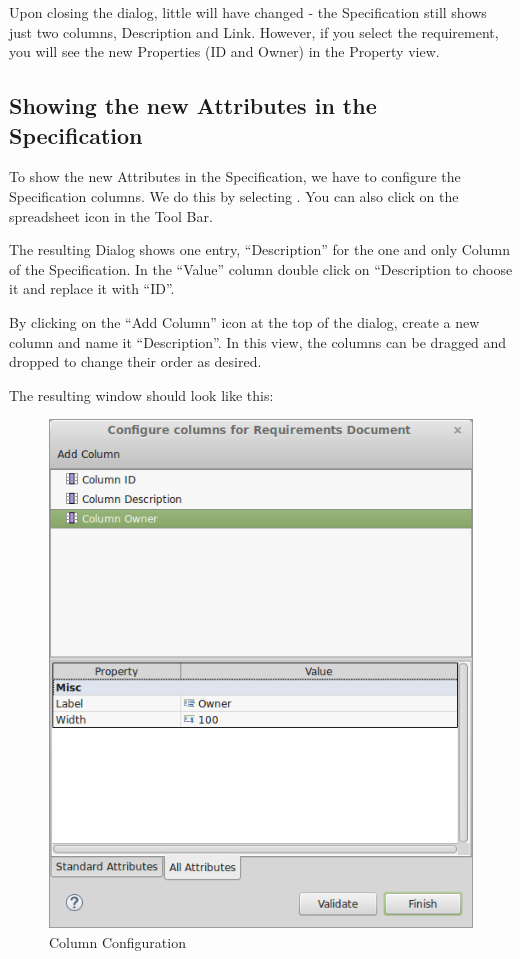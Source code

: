 Upon closing the dialog, little will have changed - the Specification still shows just two columns, Description and Link.  However, if you select the requirement, you will see the new Properties (ID and Owner) in the Property view.

\subsection{Showing the new Attributes in the Specification}

To show the new Attributes in the Specification, we have to configure the Specification columns.  We do this by selecting .  You can also click on the spreadsheet icon in the Tool Bar.

The resulting Dialog shows one entry, ``Description'' for the one and only Column of the Specification.  In the ``Value'' column double click on ``Description to choose it and replace it with ``ID''.

By clicking on the ``Add Column'' icon at the top of the dialog, create a new column and name it ``Description''.  In this view, the columns can be dragged and dropped to change their order as desired.

The resulting window should look like this:

\begin{figure}[H]
\centering      
\includegraphics[width=0.8\linewidth]{../rmf-images/columnconfig.png}      
\caption{Column Configuration}
\label{fig:column_configuration}
\end{figure}

